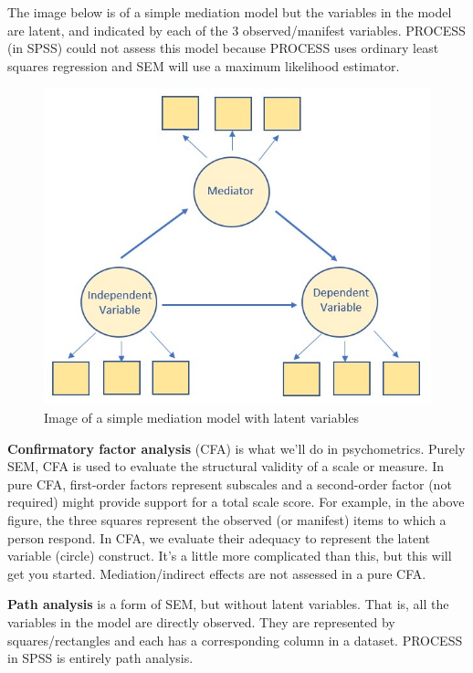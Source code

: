 \documentclass[
  english,
]{book}
\begin{document}
The image below is of a simple mediation model but the variables in the model are latent, and indicated by each of the 3 observed/manifest variables. PROCESS (in SPSS) could not assess this model because PROCESS uses ordinary least squares regression and SEM will use a maximum likelihood estimator.

\begin{figure}
\centering
\includegraphics{images/SimpleMod/SimpleMedLV.jpg}
\caption{Image of a simple mediation model with latent variables}
\end{figure}

\textbf{Confirmatory factor analysis} (CFA) is what we'll do in psychometrics. Purely SEM, CFA is used to evaluate the structural validity of a scale or measure. In pure CFA, first-order factors represent subscales and a second-order factor (not required) might provide support for a total scale score. For example, in the above figure, the three squares represent the observed (or manifest) items to which a person respond. In CFA, we evaluate their adequacy to represent the latent variable (circle) construct. It's a little more complicated than this, but this will get you started. Mediation/indirect effects are not assessed in a pure CFA.

\textbf{Path analysis} is a form of SEM, but without latent variables. That is, all the variables in the model are directly observed. They are represented by squares/rectangles and each has a corresponding column in a dataset. PROCESS in SPSS is entirely path analysis.
\end{document}
